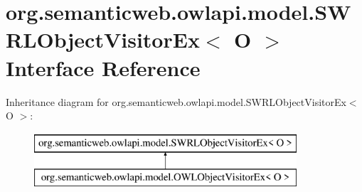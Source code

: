 \hypertarget{interfaceorg_1_1semanticweb_1_1owlapi_1_1model_1_1_s_w_r_l_object_visitor_ex_3_01_o_01_4}{\section{org.\-semanticweb.\-owlapi.\-model.\-S\-W\-R\-L\-Object\-Visitor\-Ex$<$ O $>$ Interface Reference}
\label{interfaceorg_1_1semanticweb_1_1owlapi_1_1model_1_1_s_w_r_l_object_visitor_ex_3_01_o_01_4}
}
Inheritance diagram for org.\-semanticweb.\-owlapi.\-model.\-S\-W\-R\-L\-Object\-Visitor\-Ex$<$ O $>$\-:\begin{figure}[H]
\begin{center}
\leavevmode
\includegraphics[height=2.000000cm]{interfaceorg_1_1semanticweb_1_1owlapi_1_1model_1_1_s_w_r_l_object_visitor_ex_3_01_o_01_4}
\end{center}
\end{figure}
